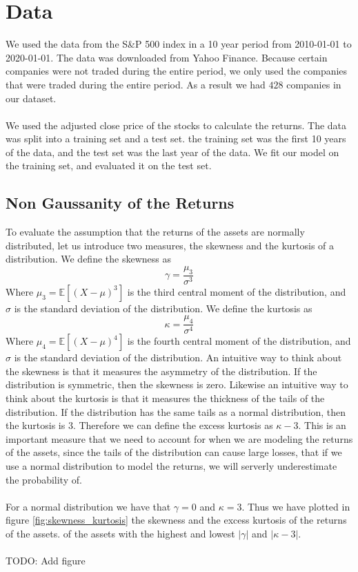 \documentclass[10pt]{article}
\begin{document}
\section{Data}
We used the data from the S\&P 500 index in a 10 year period from 2010-01-01 to 2020-01-01. The data was downloaded from Yahoo Finance.
Because certain companies were not traded during the entire period, we only used the companies that were traded during the entire period. 
As a result we had $428$ companies in our dataset.\\\\
We used the adjusted close price of the stocks to calculate the returns. The data was split into a training set and a test set. the training 
set was the first 10 years of the data, and the test set was the last year of the data. We fit our model on the training set, and evaluated it on 
the test set. 
\subsection*{Non Gaussanity of the Returns}
To evaluate the assumption that the returns of the assets are normally distributed, let us introduce two measures, the skewness and the kurtosis 
of a distribution. We define the skewness as
\begin{equation}
    \gamma = \frac{\mu_3}{\sigma^3}
\end{equation}
Where $\mu_3=\mathbb{E}[(X-\mu)^3]$ is the third central moment of the distribution, and $\sigma$ is the standard deviation of the distribution. We define the kurtosis as
\begin{equation}
    \kappa = \frac{\mu_4}{\sigma^4}
\end{equation}
Where $\mu_4=\mathbb{E}[(X-\mu)^4]$ is the fourth central moment of the distribution, and $\sigma$ is the standard deviation of the distribution. 
An intuitive way to think about the skewness is that it measures the asymmetry of the distribution. If the distribution is symmetric, then the skewness is zero.
Likewise an intuitive way to think about the kurtosis is that it measures the thickness of the tails of the distribution. If the distribution has the same tails as a normal distribution, then the kurtosis is $3$.
Therefore we can define the excess kurtosis as $\kappa-3$. This 
is an important measure that we need to account for when we are modeling the returns of the assets, since the tails of the distribution can cause large losses, that if 
we use a normal distribution to model the returns, we will serverly underestimate the probability of.\\\\
For a normal distribution we have that $\gamma=0$ and $\kappa=3$. Thus we have plotted in figure \ref{fig:skewness_kurtosis} the skewness and the excess kurtosis of the returns of the assets.
of the assets with the highest and lowest $|\gamma|$ and $|\kappa-3|$.\\\\
TODO: Add figure
\end{document}
